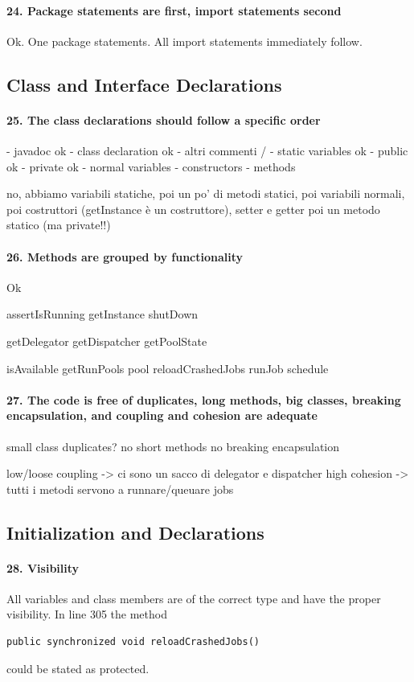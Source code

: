\documentclass[english]{article}
\begin{document}
\paragraph{24. Package statements are first, import statements second}
Ok.
One package statements.
All import statements immediately follow.

\subsection{Class and Interface Declarations}
\paragraph{25. The class declarations should follow a specific order}
- javadoc ok
- class declaration ok
- altri commenti /
- static variables ok
 - public ok
 - private ok
- normal variables 
- constructors
- methods

no, abbiamo variabili statiche, poi un po' di metodi statici, poi variabili normali, poi costruttori (getInstance è un costruttore), setter e getter poi un metodo statico (ma private!!)


\paragraph{26. Methods are grouped by functionality}
Ok

assertIsRunning
getInstance
shutDown

getDelegator
getDispatcher
getPoolState

isAvailable
getRunPools
pool
reloadCrashedJobs
runJob
schedule

\paragraph{27. The code is free of duplicates, long methods, big classes, breaking encapsulation, and coupling and cohesion are adequate}
small class
duplicates? no
short methods
no breaking encapsulation

low/loose coupling -> ci sono un sacco di delegator e dispatcher
high cohesion -> tutti i metodi servono a runnare/queuare jobs

\subsection{Initialization and Declarations}

\paragraph{28. Visibility}
All variables and class members are of the correct type and have the proper visibility.
In line 305 the method \begin{lstlisting} 
public synchronized void reloadCrashedJobs()
\end{lstlisting} could be stated as protected.
\end{document}
